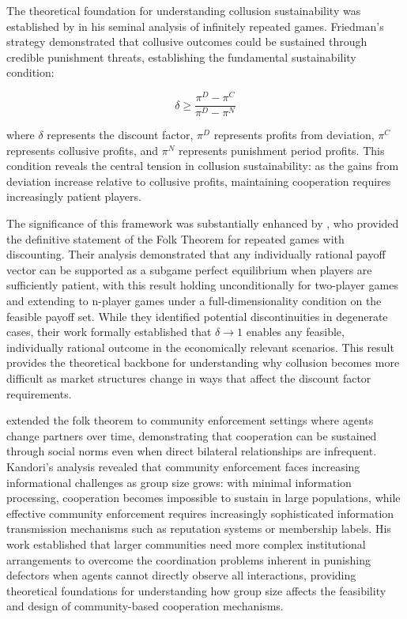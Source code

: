 The theoretical foundation for understanding collusion sustainability was established by \textcite{friedman_non-cooperative_1971} in his seminal analysis of infinitely repeated games. Friedman's  strategy demonstrated that collusive outcomes could be sustained through credible punishment threats, establishing the fundamental sustainability condition:

\begin{equation}
    \delta \geq \frac{\pi^{D} - \pi^{C}}{\pi^{D} - \pi^{N}}
\end{equation}

where $\delta$ represents the discount factor, $\pi^{D}$ represents profits from deviation, $\pi^{C}$ represents collusive profits, and $\pi^{N}$ represents punishment period profits. This condition reveals the central tension in collusion sustainability: as the gains from deviation increase relative to collusive profits, maintaining cooperation requires increasingly patient players.

The significance of this framework was substantially enhanced by \textcite{fudenberg_folk_1986}, who provided the definitive statement of the Folk Theorem for repeated games with discounting. Their analysis demonstrated that any individually rational payoff vector can be supported as a subgame perfect equilibrium when players are sufficiently patient, with this result holding unconditionally for two-player games and extending to n-player games under a full-dimensionality condition on the feasible payoff set. While they identified potential discontinuities in degenerate cases, their work formally established that $\delta \rightarrow 1$ enables any feasible, individually rational outcome in the economically relevant scenarios. This result provides the theoretical backbone for understanding why collusion becomes more difficult as market structures change in ways that affect the discount factor requirements.

\textcite{kandori_social_1992} extended the folk theorem to community enforcement settings where agents change partners over time, demonstrating that cooperation can be sustained through social norms even when direct bilateral relationships are infrequent. Kandori's analysis revealed that community enforcement faces increasing informational challenges as group size grows: with minimal information processing, cooperation becomes impossible to sustain in large populations, while effective community enforcement requires increasingly sophisticated information transmission mechanisms such as reputation systems or membership labels. His work established that larger communities need more complex institutional arrangements to overcome the coordination problems inherent in punishing defectors when agents cannot directly observe all interactions, providing theoretical foundations for understanding how group size affects the feasibility and design of community-based cooperation mechanisms.

